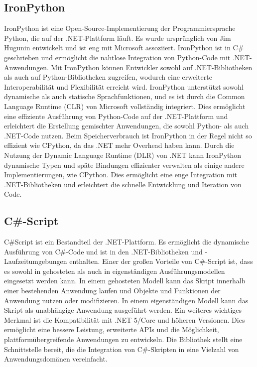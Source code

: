 \subsection{IronPython}
IronPython ist eine Open-Source-Implementierung der Programmiersprache Python, die auf der .NET-Plattform läuft. Es wurde ursprünglich von Jim Hugunin entwickelt und ist eng mit Microsoft assoziiert. IronPython ist in C\# geschrieben und ermöglicht die nahtlose Integration von Python-Code mit .NET-Anwendungen. Mit IronPython können Entwickler sowohl auf .NET-Bibliotheken als auch auf Python-Bibliotheken zugreifen, wodurch eine erweiterte Interoperabilität und Flexibilität erreicht wird.
IronPython unterstützt sowohl dynamische als auch statische Sprachfunktionen, und es ist durch die Common Language Runtime (CLR) von Microsoft vollständig integriert. Dies ermöglicht eine effiziente Ausführung von Python-Code auf der .NET-Plattform und erleichtert die Erstellung gemischter Anwendungen, die sowohl Python- als auch .NET-Code nutzen.
Beim Speicherverbrauch ist IronPython in der Regel nicht so effizient wie CPython, da das .NET mehr Overhead haben kann. 
Durch die Nutzung der Dynamic Language Runtime (DLR) von .NET kann IronPython dynamische Typen und späte Bindungen effizienter verwalten als einige andere Implementierungen, wie CPython. 
Dies ermöglicht eine enge Integration mit .NET-Bibliotheken und erleichtert die schnelle Entwicklung und Iteration von Code.
\cite{ironPython} \cite{ironPythonGithub} \cite{ironPythonInAction}
 
\newpage
\subsection{C\#-Script}
C\#Script ist ein Bestandteil der .NET-Plattform. Es ermöglicht die dynamische Ausführung von C\#-Code und ist in den .NET-Bibliotheken und -Laufzeitumgebungen enthalten. 
Einer der großen Vorteile von C\#-Script ist, dass es sowohl in gehosteten als auch in eigenständigen Ausführungsmodellen eingesetzt werden kann. 
In einem gehosteten Modell kann das Skript innerhalb einer bestehenden Anwendung laufen und Objekte und Funktionen der Anwendung nutzen oder modifizieren. 
In einem eigenständigen Modell kann das Skript als unabhängige Anwendung ausgeführt werden. 
Ein weiteres wichtiges Merkmal ist die Kompatibilität mit .NET 5/Core und höheren Versionen. 
Dies ermöglicht eine bessere Leistung, erweiterte APIs und die Möglichkeit, plattformübergreifende Anwendungen zu entwickeln. 
Die Bibliothek stellt eine  Schnittstelle bereit, die die Integration von C\#-Skripten in eine Vielzahl von Anwendungsdomänen vereinfacht.

